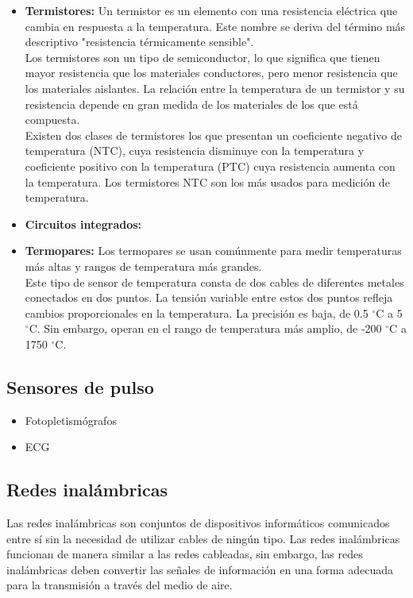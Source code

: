 		\begin{itemize}
			\item \textbf{Termistores:} Un termistor es un elemento con una resistencia eléctrica que cambia en respuesta a la temperatura. Este nombre se deriva del término más descriptivo "resistencia térmicamente sensible".\\
						
			Los termistores son un tipo de semiconductor, lo que significa que tienen mayor resistencia que los materiales conductores, pero menor resistencia que los materiales aislantes. La relación entre la temperatura de un termistor y su resistencia depende en gran medida de los materiales de los que está compuesta.\\
			
			Existen dos clases de termistores los que presentan un coeficiente negativo de temperatura (NTC), cuya resistencia disminuye con la temperatura y coeficiente positivo con la temperatura  (PTC) cuya resistencia aumenta con la temperatura. Los termistores NTC son los más usados para medición de temperatura.
			
			\item \textbf{Circuitos integrados:}
			\item \textbf{Termopares:} Los termopares se usan comúnmente para medir temperaturas más altas y rangos de temperatura más grandes.\\
			
			Este tipo de sensor de temperatura consta de dos cables de diferentes metales conectados en dos puntos. La tensión variable entre estos dos puntos refleja cambios proporcionales en la temperatura. La precisión es baja, de 0.5 $^{\circ}$C a 5 $^{\circ}$C. Sin embargo, operan en el rango de temperatura más amplio, de -200 $^{\circ}$C a 1750 $^{\circ}$C.			
		\end{itemize}
	
	\subsection{Sensores de pulso}
		\begin{itemize}
			\item Fotopletismógrafos
			\item ECG
		\end{itemize}
	
	\subsection{Redes inalámbricas}	
	Las redes inalámbricas son conjuntos de dispositivos informáticos comunicados entre sí  sin la necesidad de utilizar cables de ningún tipo. Las redes inalámbricas funcionan de manera similar a las redes cableadas, sin embargo, las redes inalámbricas deben convertir las señales de información en una forma adecuada para la transmisión a través del medio de aire. \\
	
